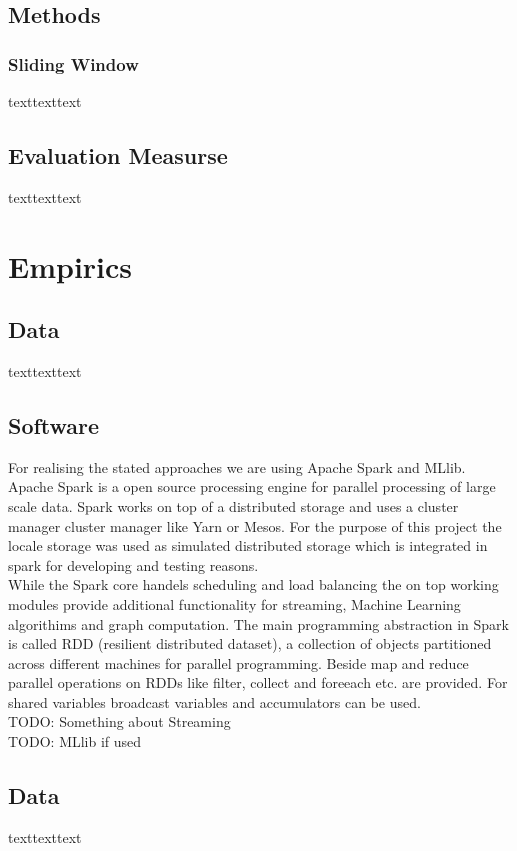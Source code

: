 \documentclass[12pt]{article}
\begin{document}
\subsection{Methods}
\subsubsection{Sliding Window}
texttexttext

\subsection{Evaluation Measurse}
texttexttext

\section{Empirics}
\subsection{Data}
texttexttext

\subsection{Software}
For realising the stated approaches we are using Apache Spark and MLlib. Apache Spark is a open source processing engine for parallel processing of large scale data. Spark works on top of a distributed storage and uses a cluster manager cluster manager like Yarn or Mesos. For the purpose of this project the locale storage was used as simulated distributed storage which is integrated in spark for developing and testing reasons.  \\
While the Spark core handels scheduling and load balancing the on top working modules provide additional functionality for streaming, Machine Learning  algorithims and graph computation. The main programming abstraction in Spark is called RDD (resilient distributed dataset), a collection of objects partitioned across different machines for parallel programming. Beside map and reduce parallel operations on RDDs like filter, collect and foreeach etc. are provided. For shared variables broadcast variables and  accumulators can be used.
\\ 
TODO: Something about Streaming
\\
TODO: MLlib if used


\subsection{Data}
texttexttext
\end{document}
